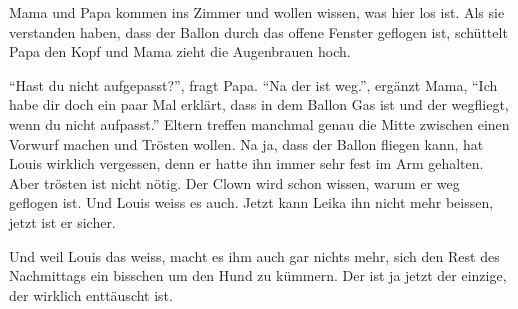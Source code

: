 Mama und Papa kommen ins Zimmer und wollen wissen, was hier los ist. Als sie verstanden haben, dass der Ballon durch das offene Fenster geflogen ist, schüttelt Papa den Kopf und Mama zieht die Augenbrauen hoch.

\enquote{Hast du nicht aufgepasst?}, fragt Papa. \enquote{Na der ist weg.}, ergänzt Mama, \enquote{Ich habe dir doch ein paar Mal erklärt, dass in dem Ballon Gas ist und der wegfliegt, wenn du nicht aufpasst.} Eltern treffen manchmal genau die Mitte zwischen einen Vorwurf machen und Trösten wollen. Na ja, dass der Ballon fliegen kann, hat Louis wirklich vergessen, denn er hatte ihn immer sehr fest im Arm gehalten. Aber trösten ist nicht nötig. Der Clown wird schon wissen, warum er weg geflogen ist. Und Louis weiss es auch. Jetzt kann Leika ihn nicht mehr beissen, jetzt ist er sicher.

Und weil Louis das weiss, macht es ihm auch gar nichts mehr, sich den Rest des Nachmittags ein bisschen um den Hund zu kümmern. Der ist ja jetzt der einzige, der wirklich enttäuscht ist.  \hfill {\color{red}\decofourleft}
